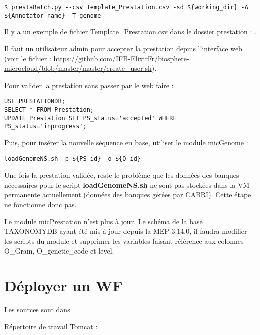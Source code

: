 \begin{lstlisting}[style=bash]
$ prestaBatch.py --csv Template_Prestation.csv -sd ${working_dir} -A ${Annotator_name} -T genome
\end{lstlisting}

Il y a un exemple de fichier Template\_Prestation.csv dans le dossier prestation : .
\newline
\begin{mycolorbox}
	Il faut un utilisateur admin pour accepter la prestation depuis l'interface web (voir le fichier : \url{https://github.com/IFB-ElixirFr/biosphere-microcloud/blob/master/master/create_user.sh}).
\end{mycolorbox}
\bigskip

Pour valider la prestation sans passer par le web faire :
\begin{lstlisting}[style=SQL]
USE PRESTATIONDB;
SELECT * FROM Prestation;
UPDATE Prestation SET PS_status='accepted' WHERE PS_status='inprogress';
\end{lstlisting}
\bigskip
Puis, pour insérer la nouvelle séquence en base, utiliser le module micGenome :
\begin{lstlisting}[style=bash]
loadGenomeNS.sh -p ${PS_id} -o ${O_id}
\end{lstlisting}

\begin{mycolorbox}
	Une fois la prestation validée, reste le problème que les données des banques nécessaires pour le script \textbf{loadGenomeNS.sh} ne sont pas stockées dans la VM permanente actuellement (données des banques gérées par CABRI).
	Cette étape ne fonctionne donc pas.
\end{mycolorbox}

Le module micPrestation n'est plus à jour. Le schéma de la base TAXONOMYDB ayant été mis à jour depuis la MEP 3.14.0, il faudra modifier les scripts du module et supprimer les variables faisant référence aux colonnes O\_Gram, O\_genetic\_code et level.
\newline

\section{Déployer un WF}
Les sources sont dans 
\newline

Répertoire de travail Tomcat : 
\newline

